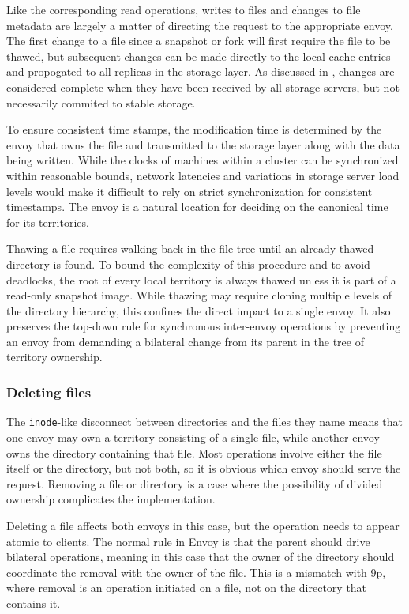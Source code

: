 Like the corresponding read operations, writes to files and changes to file metadata are largely a matter of directing the request to the appropriate envoy. The first change to a file since a snapshot or fork will first require the file to be thawed, but subsequent changes can be made directly to the local cache entries and propogated to all replicas in the storage layer. As discussed in , changes are considered complete when they have been received by all storage servers, but not necessarily commited to stable storage.

To ensure consistent time stamps, the modification time is determined by the envoy that owns the file and transmitted to the storage layer along with the data being written. While the clocks of machines within a cluster can be synchronized within reasonable bounds, network latencies and variations in storage server load levels would make it difficult to rely on strict synchronization for consistent timestamps. The envoy is a natural location for deciding on the canonical time for its territories.

Thawing a file requires walking back in the file tree until an already-thawed directory is found. To bound the complexity of this procedure and to avoid deadlocks, the root of every local territory is always thawed unless it is part of a read-only snapshot image. While thawing may require cloning multiple levels of the directory hierarchy, this confines the direct impact to a single envoy. It also preserves the top-down rule for synchronous inter-envoy operations by preventing an envoy from demanding a bilateral change from its parent in the tree of territory ownership.

\subsubsection{Deleting files}

The \texttt{inode}-like disconnect between directories and the files they name means that one envoy may own a territory consisting of a single file, while another envoy owns the directory containing that file. Most operations involve either the file itself or the directory, but not both, so it is obvious which envoy should serve the request. Removing a file or directory is a case where the possibility of divided ownership complicates the implementation.

Deleting a file affects both envoys in this case, but the operation needs to appear atomic to clients. The normal rule in Envoy is that the parent should drive bilateral operations, meaning in this case that the owner of the directory should coordinate the removal with the owner of the file. This is a mismatch with 9p, where removal is an operation initiated on a file, not on the directory that contains it.

